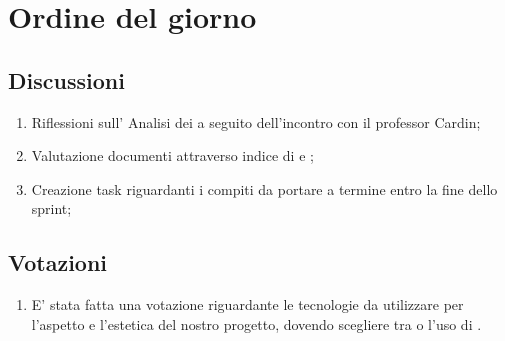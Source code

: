 \section{Ordine del giorno} \label{sec:agenda}
\subsection{Discussioni} \label{subsec:discussione}
\begin{enumerate}
    \item Riflessioni sull' Analisi dei  a seguito dell'incontro con il professor Cardin;
    \item Valutazione documenti attraverso indice di  e ;
    \item Creazione task riguardanti i compiti da portare a termine entro la fine dello sprint;
    
\end{enumerate}

\subsection{Votazioni} \label{subsec:votazione}
\begin{enumerate}
    \item E' stata fatta una votazione riguardante le tecnologie da utilizzare per l'aspetto e l'estetica del nostro progetto, dovendo scegliere tra  o l'uso di .
\end{enumerate}